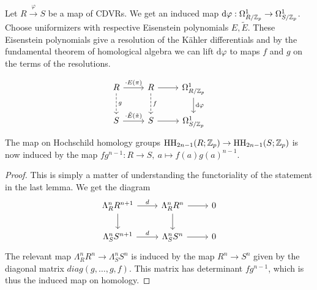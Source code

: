 \begin{prop}
    Let $R\xrightarrow{\varphi} S$ be a map of CDVRs. We get an induced map $\mathrm{d}\varphi:\Omega^1_{R/\mathbb{Z}_p}\to \Omega^1_{S/\mathbb{Z}_p}$. Choose uniformizers with respective Eisenstein polynomials $E,\tilde{E}$. These Eisenstein polynomials give a resolution of the Kähler differentials and by the fundamental theorem of homological algebra we can lift $\mathrm{d}\varphi$ to maps $f$ and $g$ on the terms of the resolutions. 
    
    
\[\begin{tikzcd}
	R & R & {\Omega^1_{R/\mathbb{Z}_p}} \\
	S & S & {\Omega^1_{S/\mathbb{Z}_p}}
	\arrow[from=1-2, to=1-3]
	\arrow["{\cdot E(\pi)}", from=1-1, to=1-2]
	\arrow["{\cdot \tilde{E}(\tilde{\pi})}", from=2-1, to=2-2]
	\arrow[from=2-2, to=2-3]
	\arrow["{\mathrm{d}\varphi}", from=1-3, to=2-3]
	\arrow["f", dashed, from=1-2, to=2-2]
	\arrow["g", dashed, from=1-1, to=2-1]
\end{tikzcd}\]
    The map on Hochschild homology groups $\operatorname{HH}_{2n-1}(R;\mathbb{Z}_p)\to         \operatorname{HH}_{2n-1}(S;\mathbb{Z}_p)$ is now induced by the map $fg^{n-1}:R\to S,\ a\mapsto f(a)g(a)^{n-1}$.
\end{prop}
\begin{proof}
    This is simply a matter of understanding the functoriality of the statement in the last lemma. We get the diagram
    \[\begin{tikzcd}
	{\Lambda_R^nR^{n+1}} & {\Lambda_R^nR^n} & 0 \\
	{\Lambda_S^nS^{n+1}} & {\Lambda_S^nS^n} & 0
	\arrow[from=1-2, to=1-3]
	\arrow[from=2-2, to=2-3]
	\arrow["d", from=2-1, to=2-2]
	\arrow["d", from=1-1, to=1-2]
	\arrow[from=1-1, to=2-1]
	\arrow[from=1-2, to=2-2]
    \end{tikzcd}\]
    The relevant map $\Lambda_R^nR^n\to \Lambda_S^nS^n$ is induced by the map $R^n\to S^n$ given by the diagonal matrix $diag(g,\dots, g, f)$. This matrix has determinant $fg^{n-1}$, which is thus the induced map on homology.
\end{proof}
